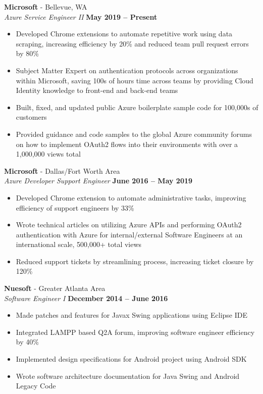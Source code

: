 \documentclass[margin,line]{resume}
\begin{document}
\begin{resume}
	\textbf{Microsoft} - Bellevue, WA \vspace{1mm}\\\vspace{1mm}
	\textsl{Azure Service Engineer II} \hfill \textbf{May 2019 -- Present}
	\begin{itemize}
		\item Developed Chrome extensions to automate repetitive work using data scraping, increasing efficiency by 20\% and reduced team pull request errors by 80\%
		\item Subject Matter Expert on authentication protocols across organizations within Microsoft, saving 100s of hours time across teams by providing Cloud Identity knowledge to front-end and back-end teams
		\item Built, fixed, and updated public Azure boilerplate sample code for 100,000s of customers
		\item Provided guidance and code samples to the global Azure community forums on how to implement OAuth2 flows into their environments with over a 1,000,000 views total 
	\end{itemize}
		
	\textbf{Microsoft} - Dallas/Fort Worth Area\vspace{1mm}\\\vspace{1mm}
	\textsl{Azure Developer Support Engineer} \hfill \textbf{June 2016 -- May 2019}
	\begin{itemize}
		 \item Developed Chrome extension to automate administrative tasks, improving efficiency of support engineers by 33\%
		 \item Wrote technical articles on utilizing Azure APIs and performing OAuth2 authentication with Azure for internal/external Software Engineers at an international scale, 500,000+ total views
		 \item Reduced support tickets by streamlining process, increasing ticket closure by 120\%
		 
	
	\end{itemize}

	\textbf{Nuesoft} - Greater Atlanta Area \vspace{1mm}\\\vspace{1mm}%
	\textsl{Software Engineer I} \hfill \textbf{December 2014 -- June 2016}
	\begin{itemize}
	 	\item Made patches and features for Javax Swing applications using Eclipse IDE 
	 	\item Integrated LAMPP based Q2A forum, improving software engineer efficiency by 40\%
	 	\item Implemented design specifications for Android project using Android SDK
	 	\item Wrote software architecture documentation for Java Swing and Android Legacy Code 
	\end{itemize}


\end{resume}
\end{document}
